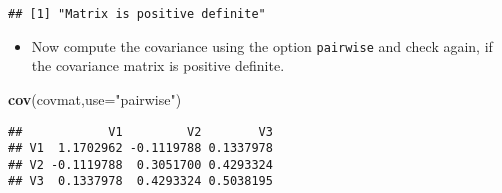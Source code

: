 \documentclass[]{article}
\newenvironment{Shaded}{\begin{snugshade}}{\end{snugshade}}
\newcommand{\KeywordTok}[1]{\textcolor[rgb]{0.13,0.29,0.53}{\textbf{#1}}}
\newcommand{\DataTypeTok}[1]{\textcolor[rgb]{0.13,0.29,0.53}{#1}}
\newcommand{\DecValTok}[1]{\textcolor[rgb]{0.00,0.00,0.81}{#1}}
\newcommand{\StringTok}[1]{\textcolor[rgb]{0.31,0.60,0.02}{#1}}
\newcommand{\ControlFlowTok}[1]{\textcolor[rgb]{0.13,0.29,0.53}{\textbf{#1}}}
\newcommand{\OperatorTok}[1]{\textcolor[rgb]{0.81,0.36,0.00}{\textbf{#1}}}
\newcommand{\NormalTok}[1]{#1}
\providecommand{\tightlist}{%
  \setlength{\itemsep}{0pt}\setlength{\parskip}{0pt}}
\begin{document}
\begin{Shaded}
\end{Shaded}

\begin{verbatim}
## [1] "Matrix is positive definite"
\end{verbatim}

\begin{itemize}
\tightlist
\item
  Now compute the covariance using the option \texttt{pairwise} and
  check again, if the covariance matrix is positive definite.
\end{itemize}

\begin{Shaded}
\begin{Highlighting}[]
\KeywordTok{cov}\NormalTok{(covmat,}\DataTypeTok{use=}\StringTok{"pairwise"}\NormalTok{)}
\end{Highlighting}
\end{Shaded}

\begin{verbatim}
##            V1         V2        V3
## V1  1.1702962 -0.1119788 0.1337978
## V2 -0.1119788  0.3051700 0.4293324
## V3  0.1337978  0.4293324 0.5038195
\end{verbatim}

\begin{Shaded}
\end{Shaded}
\end{document}
